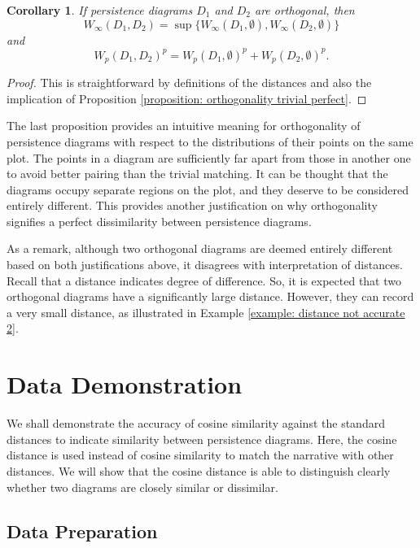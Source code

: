 \documentclass[sn-mathphys-num]{sn-jnl}%
\theoremstyle{thmstyleone}%
\newtheorem{corollary}[theorem]{Corollary}
\theoremstyle{thmstyletwo}%
\theoremstyle{thmstylethree}%
\begin{document}
\begin{corollary}
	If persistence diagrams $D_1$ and $D_2$ are orthogonal, then
	\begin{equation*}
		W_{\infty}(D_1, D_2)=\sup \big\{W_{\infty}(D_1, \emptyset), W_{\infty}(D_2, \emptyset)\big\}
	\end{equation*}
	and
	\begin{equation*}
		{W_p(D_1, D_2)}^p={W_p(D_1, \emptyset)}^p+{W_p(D_2, \emptyset)}^p.
	\end{equation*}
\end{corollary}
\begin{proof}
	This is straightforward by definitions of the distances and also the implication of Proposition \ref{proposition: orthogonality trivial perfect}.
\end{proof}

The last proposition provides an intuitive meaning for orthogonality of persistence diagrams with respect to the distributions of their points on the same plot. The points in a diagram are sufficiently far apart from those in another one to avoid better pairing than the trivial matching. It can be thought that the diagrams occupy separate regions on the plot, and they deserve to be considered entirely different. This provides another justification on why orthogonality signifies a perfect dissimilarity between persistence diagrams.

As a remark, although two orthogonal diagrams are deemed entirely different based on both justifications above, it disagrees with interpretation of distances. Recall that a distance indicates degree of difference. So, it is expected that two orthogonal diagrams have a significantly large distance. However, they can record a very small distance, as illustrated in Example \ref{example: distance not accurate 2}. 

\section{Data Demonstration}\label{section: data demo}

We shall demonstrate the accuracy of cosine similarity against the standard distances to indicate similarity between persistence diagrams. Here, the cosine distance is used instead of cosine similarity to match the narrative with other distances. We will show that the cosine distance is able to distinguish clearly whether two diagrams are closely similar or dissimilar.

\subsection{Data Preparation}
\end{document}
